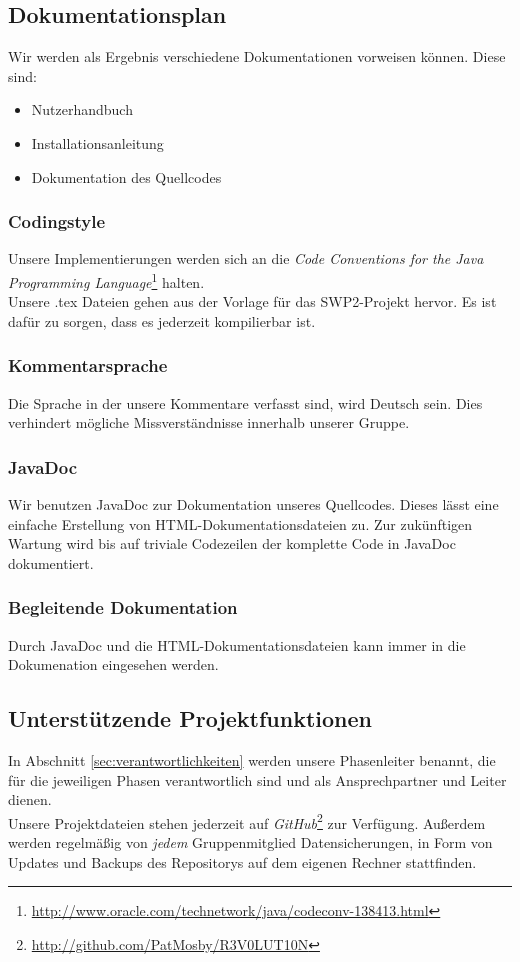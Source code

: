 \documentclass[fontsize=12pt,paper=a4,twoside]{scrartcl}
\begin{document}
\subsection{Dokumentationsplan}
Wir werden als Ergebnis verschiedene Dokumentationen vorweisen können. Diese sind:

\begin{itemize}
\item{Nutzerhandbuch}
\item{Installationsanleitung}
\item{Dokumentation des Quellcodes}
\end{itemize}

\subsubsection{Codingstyle}
Unsere Implementierungen werden sich an die \emph{Code Conventions for the Java Programming Language}\footnote{\url{http://www.oracle.com/technetwork/java/codeconv-138413.html}} halten.\\
Unsere .tex Dateien gehen aus der Vorlage für das SWP2-Projekt hervor. Es ist dafür zu sorgen, dass es jederzeit kompilierbar ist.

\subsubsection{Kommentarsprache}
Die Sprache in der unsere Kommentare verfasst sind, wird Deutsch sein. Dies verhindert mögliche Missverständnisse innerhalb unserer Gruppe.

\subsubsection{JavaDoc}
Wir benutzen JavaDoc zur Dokumentation unseres Quellcodes. Dieses lässt eine einfache Erstellung von HTML-Dokumentationsdateien zu.
Zur zukünftigen Wartung wird bis auf triviale Codezeilen der komplette Code in JavaDoc dokumentiert.

\subsubsection{Begleitende Dokumentation}
Durch JavaDoc und die HTML-Dokumentationsdateien kann immer in die Dokumenation eingesehen werden.

\subsection{Unterstützende Projektfunktionen}
In Abschnitt \ref{sec:verantwortlichkeiten} werden unsere Phasenleiter benannt, die für die jeweiligen Phasen verantwortlich sind und als Ansprechpartner und Leiter dienen.\\
Unsere Projektdateien stehen jederzeit auf \emph{GitHub}\footnote{\url{http://github.com/PatMosby/R3V0LUT10N}} zur Verfügung. Außerdem werden regelmäßig von \emph{jedem} Gruppenmitglied Datensicherungen, in Form von Updates und Backups des Repositorys auf dem eigenen Rechner stattfinden.
\end{document}
